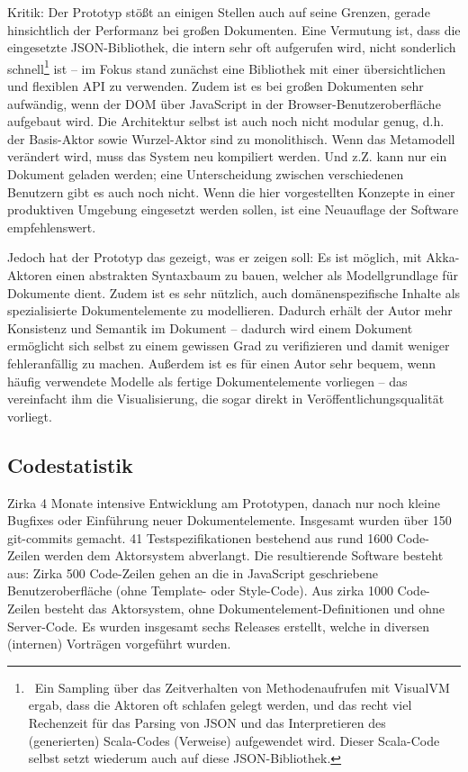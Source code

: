 Kritik: Der Prototyp stößt an einigen Stellen auch auf seine Grenzen, gerade hinsichtlich der Performanz bei großen Dokumenten. Eine Vermutung ist, dass die eingesetzte JSON-Bibliothek, die intern sehr oft aufgerufen wird, nicht sonderlich schnell\footnote{~Ein Sampling über das Zeitverhalten von Methodenaufrufen mit VisualVM ergab, dass die Aktoren oft schlafen gelegt werden, und das recht viel Rechenzeit für das Parsing von JSON und das Interpretieren des (generierten) Scala-Codes (Verweise) aufgewendet wird. Dieser Scala-Code selbst setzt wiederum auch auf diese JSON-Bibliothek.} ist --  im Fokus stand zunächst eine Bibliothek mit einer übersichtlichen und flexiblen API zu verwenden. Zudem ist es bei großen Dokumenten sehr aufwändig, wenn der DOM über JavaScript in der Browser-Benutzeroberfläche aufgebaut wird. Die Architektur selbst ist auch noch nicht modular genug, d.h. der Basis-Aktor sowie Wurzel-Aktor sind zu monolithisch. Wenn das Metamodell verändert wird, muss das System neu kompiliert werden. Und z.Z. kann nur ein Dokument geladen werden; eine Unterscheidung zwischen verschiedenen Benutzern gibt es auch noch nicht. Wenn die hier vorgestellten Konzepte in einer produktiven Umgebung eingesetzt werden sollen, ist eine Neuauflage der Software empfehlenswert.

 
Jedoch hat der Prototyp das gezeigt, was er zeigen soll: Es ist möglich, mit Akka-Aktoren einen abstrakten Syntaxbaum zu bauen, welcher als Modellgrundlage für Dokumente dient. Zudem ist es sehr nützlich, auch domänenspezifische Inhalte als spezialisierte Dokumentelemente zu modellieren. Dadurch erhält der Autor mehr Konsistenz und Semantik im Dokument -- dadurch wird einem Dokument ermöglicht sich selbst zu einem gewissen Grad zu verifizieren und damit weniger fehleranfällig zu machen. Außerdem ist es für einen Autor sehr bequem, wenn häufig verwendete Modelle als fertige Dokumentelemente vorliegen -- das vereinfacht ihm die Visualisierung, die sogar direkt in Veröffentlichungsqualität vorliegt.

 
\subsection{Codestatistik}\label{}
 
Zirka 4 Monate intensive Entwicklung am Prototypen, danach nur noch kleine Bugfixes oder Einführung neuer Dokumentelemente. Insgesamt wurden über 150 git-commits gemacht. 41 Testspezifikationen bestehend aus rund 1600 Code-Zeilen werden dem Aktorsystem abverlangt. Die resultierende Software besteht aus: Zirka 500 Code-Zeilen gehen an die in JavaScript geschriebene Benutzeroberfläche (ohne Template- oder Style-Code). Aus zirka 1000 Code-Zeilen besteht das Aktorsystem, ohne Dokumentelement-Definitionen und ohne Server-Code. Es wurden insgesamt sechs Releases erstellt, welche in diversen (internen) Vorträgen vorgeführt wurden.

